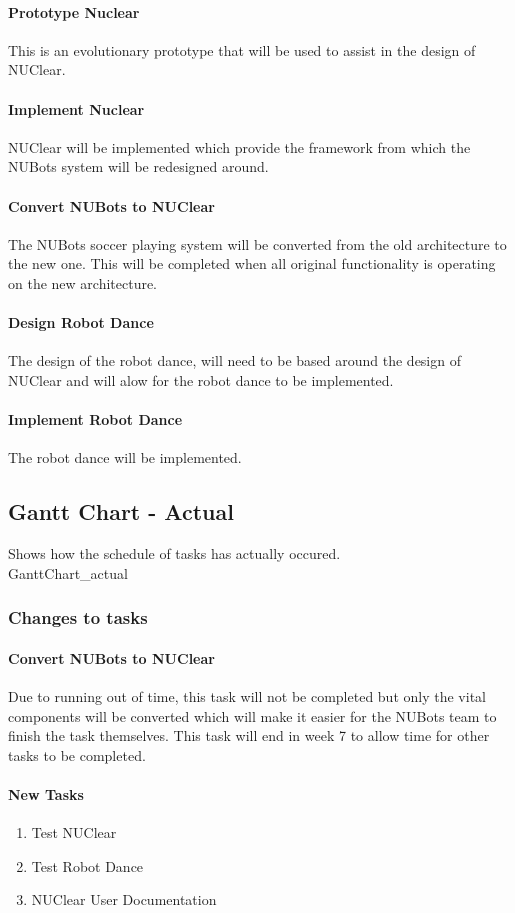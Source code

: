 \documentclass[a4paper]{article}
\begin{document}
				\paragraph{Prototype Nuclear}
					This is an evolutionary prototype that will be used to assist in the design of NUClear.
				\paragraph{Implement Nuclear}
					NUClear will be implemented which provide the framework from which the NUBots system will be redesigned around.
				\paragraph{Convert NUBots to NUClear}
					The NUBots soccer playing system will be converted from the old architecture to the new one. This will be completed when all original functionality is operating on the new architecture.
				\paragraph{Design Robot Dance}
					The design of the robot dance, will need to be based around the design of NUClear and will alow for the robot dance to be implemented.
				\paragraph{Implement Robot Dance}
					The robot dance will be implemented.
		\subsection{Gantt Chart - Actual}
			Shows how the schedule of tasks has actually occured. \\
			{GanttChart_actual}
			\subsubsection{Changes to tasks}
				\paragraph{Convert NUBots to NUClear}
					Due to running out of time, this task will not be completed but only the vital components will be converted which will make it easier for the NUBots team to finish the task themselves. This task will end in week 7 to allow time for other tasks to be completed.
				\paragraph{New Tasks}
					\begin{enumerate}
						\item Test NUClear
						\item Test Robot Dance
						\item NUClear User Documentation
					\end{enumerate}
\end{document}
